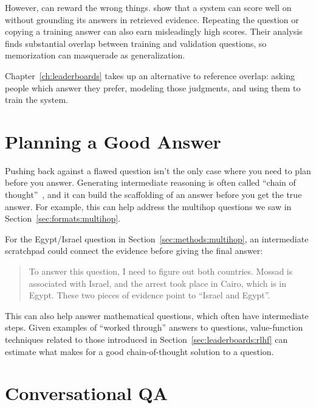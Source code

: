 However,  can reward the wrong things.  \citet{krishna-21} show that a system can score well on  without grounding its answers in retrieved evidence.  Repeating the question or copying a training answer can also earn misleadingly high scores.  Their analysis finds substantial overlap between training and validation questions, so memorization can masquerade as generalization.

Chapter~\ref{ch:leaderboards} takes up an alternative to reference overlap: asking people which answer they prefer, modeling those judgments, and using them to train the system.


\section{Planning a Good Answer}
\label{sec:methods:planning}

Pushing back against a flawed question isn't the only case where you need to plan before you answer.  Generating intermediate reasoning is often called ``chain of thought''~\citep{wei-22}, and it can build the scaffolding of an answer before you get the true answer.  For example, this can help address the multihop questions we saw in Section~\ref{sec:formats:multihop}.

For the Egypt/Israel question in Section~\ref{sec:methods:multihop}, an intermediate scratchpad could connect the evidence before giving the final answer:
\begin{quote}
	To answer this question, I need to figure out both countries.  Mossad is associated with Israel, and the arrest took place in Cairo, which is in Egypt.  These two pieces of evidence point to ``Israel and Egypt''.
\end{quote}

This can also help answer mathematical questions, which often have intermediate steps.  Given examples of ``worked through'' answers to questions, value-function techniques related to those introduced in Section~\ref{sec:leaderboards:rlhf} can estimate what makes for a good chain-of-thought solution to a question.


\section{Conversational QA}
\label{sec:formats:conversation}

